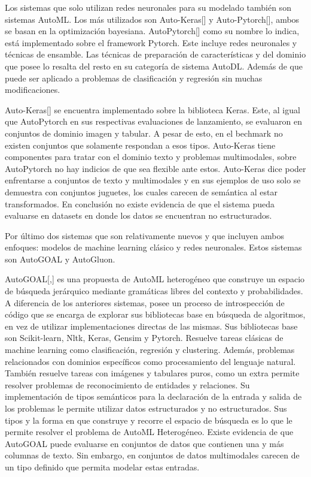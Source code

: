 Los sistemas que solo utilizan redes neuronales para su modelado también son sistemas AutoML. Los más utilizados son Auto-Keras[\cite{13}] y Auto-Pytorch[\cite{21}], 
ambos se basan en la optimización bayesiana. 
AutoPytorch[\cite{21}] como su nombre lo indica, está implementado sobre el framework Pytorch. Este incluye redes neuronales y técnicas de ensamble. 
Las técnicas de preparación de características y del dominio que posee lo resalta del resto en su categoría de sistema AutoDL. Además de que puede ser aplicado a 
problemas de clasificación y regresión sin muchas modificaciones.

Auto-Keras[\cite{13}] se encuentra implementado sobre la biblioteca Keras. Este, al igual que AutoPytorch en sus respectivas evaluaciones de lanzamiento, 
se evaluaron en conjuntos de dominio imagen y tabular. A pesar de esto, en el bechmark no existen conjuntos que solamente respondan a esos tipos. 
Auto-Keras tiene componentes para tratar con el dominio texto y problemas multimodales, sobre AutoPytorch no hay indicios de que sea flexible 
ante estos. 
Auto-Keras dice poder enfrentarse a conjuntos de texto y multimodales y en sus ejemplos de uso solo se demuestra con conjuntos juguetes, los cuales carecen de 
semántica al estar transformados. En conclusión no existe evidencia de que el sistema pueda evaluarse en datasets en donde los datos se encuentran no estructurados. 

Por último dos sistemas que son relativamente nuevos y que incluyen ambos enfoques: modelos de machine learning clásico y redes neuronales. 
Estos sistemas son AutoGOAL y AutoGluon.

AutoGOAL[\cite{40},\cite{41}] es una propuesta de AutoML heterogéneo que construye un espacio de búsqueda jerárquico mediante gramáticas libres del contexto y 
probabilidades. A diferencia de los anteriores sistemas, posee un proceso 
de introspección de código que se encarga de explorar sus bibliotecas base en búsqueda de algoritmos, en vez de utilizar implementaciones directas de las mismas.
Sus bibliotecas base son Scikit-learn, Nltk, Keras, Gensim y Pytorch.
Resuelve tareas clásicas de machine learning como clasificación, regresión y clustering. Además, problemas relacionados con dominios específicos como procesamiento 
del lenguaje natural. También resuelve tareas con imágenes y tabulares puros, como un extra permite resolver problemas de reconocimiento de entidades y relaciones.
Su implementación de tipos semánticos para la declaración de la entrada y salida de los problemas le permite utilizar datos estructurados y no estructurados. Sus 
tipos y la forma en que construye y recorre el espacio de búsqueda es lo que le permite resolver el problema de AutoML Heterogéneo. 
Existe evidencia de que AutoGOAL puede evaluarse en conjuntos de datos que contienen una y más columnas de texto. Sin embargo, en conjuntos de datos multimodales 
carecen de un tipo definido que permita modelar estas entradas.   

